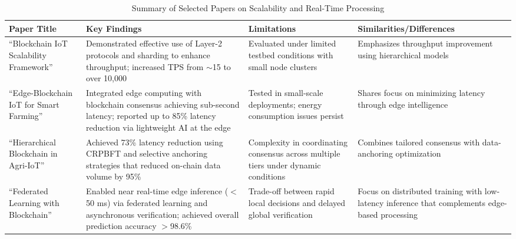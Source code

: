 \documentclass[12pt,onecolumn]{IEEEtran} %
\begin{document}
\begin{table}[h!]
\centering
\caption{Summary of Selected Papers on Scalability and Real-Time Processing}
\label{tab:scalability}
\begin{tabularx}{\columnwidth}{@{}lYYY@{}}
\toprule
\textbf{Paper Title} & \textbf{Key Findings} & \textbf{Limitations} & \textbf{Similarities/Differences} \\
\midrule
``Blockchain IoT Scalability Framework'' & Demonstrated effective use of Layer-2 protocols and sharding to enhance throughput; increased TPS from $\sim$15 to over 10,000 \cite{huang2025digitaltraceabilityin, abdurrohim2024blockchainbasedframeworkfor} & Evaluated under limited testbed conditions with small node clusters & Emphasizes throughput improvement using hierarchical models \\
\midrule
``Edge-Blockchain IoT for Smart Farming'' & Integrated edge computing with blockchain consensus achieving sub-second latency; reported up to 85\% latency reduction via lightweight AI at the edge \cite{huang2025digitaltraceabilityin, huang2025digitaltraceabilityin} & Tested in small-scale deployments; energy consumption issues persist & Shares focus on minimizing latency through edge intelligence \\
\midrule
``Hierarchical Blockchain in Agri-IoT'' & Achieved 73\% latency reduction using CRPBFT and selective anchoring strategies that reduced on-chain data volume by 95\% \cite{thiruvenkatasamy2025anonlinetool, huang2025digitaltraceabilityin} & Complexity in coordinating consensus across multiple tiers under dynamic conditions & Combines tailored consensus with data-anchoring optimization \\
\midrule
``Federated Learning with Blockchain'' & Enabled near real-time edge inference ($<$50 ms) via federated learning and asynchronous verification; achieved overall prediction accuracy $>$98.6\% \cite{huang2025digitaltraceabilityin, huang2025digitaltraceabilityin} & Trade-off between rapid local decisions and delayed global verification & Focus on distributed training with low-latency inference that complements edge-based processing \\
\bottomrule
\end{tabularx}
\end{table}
\end{document}
